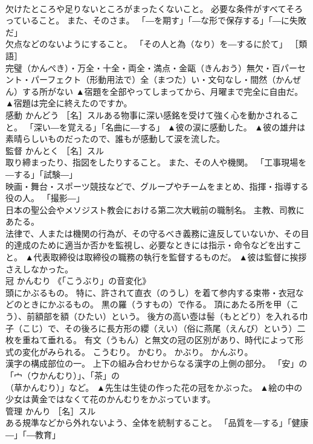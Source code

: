 \documentclass[8pt]{extreport}
\begin{document}
\begin{CJK}{UTF8}{min}
\\	欠けたところや足りないところがまったくないこと。 必要な条件がすべてそろっていること。 また、そのさま。 「―を期す」「―な形で保存する」「―に失敗だ」 
\\	欠点などのないようにすること。 「その人と為（なり）を―するに於て」 ［類語］
\\	完璧（かんぺき）・万全・十全・両全・満点・金甌（きんおう）無欠・百パーセント・パーフェクト（形動用法で）全（まつた）い・文句なし・間然（かんぜん）する所がない	▲宿題を全部やってしまってから、月曜まで完全に自由だ。 ▲宿題は完全に終えたのですか。
\\	感動	かんどう	［名］スルある物事に深い感銘を受けて強く心を動かされること。 「深い―を覚える」「名曲に―する」	▲彼の涙に感動した。 ▲彼の雄弁は素晴らしいものだったので、誰もが感動して涙を流した。
\\	監督	かんとく	［名］スル 
\\	取り締まったり、指図をしたりすること。 また、その人や機関。 「工事現場を―する」「試験―」 
\\	映画・舞台・スポーツ競技などで、グループやチームをまとめ、指揮・指導する役の人。 「撮影―」 
\\	日本の聖公会やメソジスト教会における第二次大戦前の職制名。 主教、司教にあたる。 
\\	法律で、人または機関の行為が、その守るべき義務に違反していないか、その目的達成のために適当か否かを監視し、必要なときには指示・命令などを出すこと。	▲代表取締役は取締役の職務の執行を監督するものだ。 ▲彼は監督に挨拶さえしなかった。
\\	冠	かんむり	《「こうぶり」の音変化》 
\\	頭にかぶるもの。 特に、許されて直衣（のうし）を着て参内する束帯・衣冠などのときにかぶるもの。 黒の羅（うすもの）で作る。 頂にあたる所を甲（こう）、前額部を額（ひたい）という。 後方の高い壺は髻（もとどり）を入れる巾子（こじ）で、その後ろに長方形の纓（えい）（俗に燕尾（えんび）という）二枚を重ねて垂れる。 有文（うもん）と無文の冠の区別があり、時代によって形式の変化がみられる。 こうむり。 かむり。 かぶり。 かんぶり。 
\\	漢字の構成部位の一。 上下の組み合わせからなる漢字の上側の部分。 「安」の「宀（ウかんむり）」、「茶」の
\\	（草かんむり）」など。	▲先生は生徒の作った花の冠をかぶった。 ▲絵の中の少女は黄金ではなくて花のかんむりをかぶっています。
\\	管理	かんり	［名］スル 
\\	ある規準などから外れないよう、全体を統制すること。 「品質を―する」「健康―」「―教育」 

\end{CJK}
\end{document}
